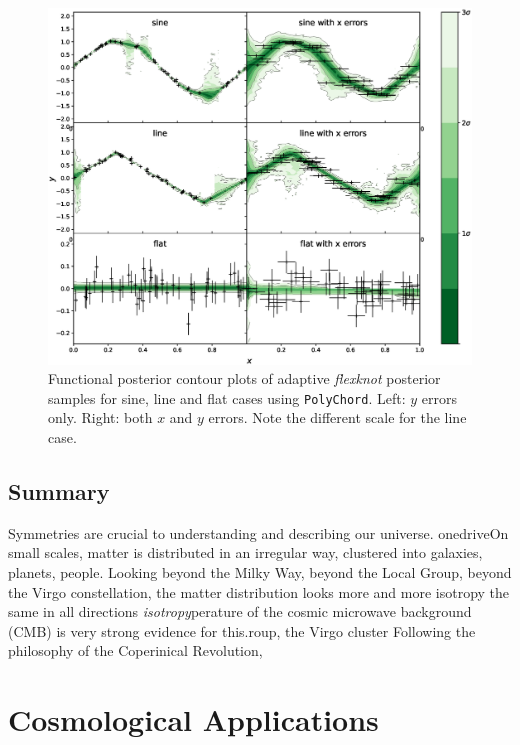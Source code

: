 \documentclass{article}
\begin{document}
\newpage

\newpage


\newpage

\begin{figure}[H]
  \centering
  \includegraphics[width=16cm]{toysineadaptive.eps}
  \caption{Functional posterior contour plots of adaptive \textit{flexknot} posterior samples for sine, line and flat cases using \texttt{PolyChord}. Left: $y$ errors only. Right: both $x$ and $y$ errors. Note the different scale for the line case.}
  \label{fig:toysineadaptive}
\end{figure}
\subsection{Summary}
Symmetries are crucial to understanding and describing our universe. onedriveOn small scales, matter is distributed in an irregular way, clustered into galaxies, planets, people. Looking beyond the Milky Way, beyond the Local Group, beyond the Virgo constellation, the matter distribution looks more and more isotropy the same in all directions \textit{isotropy}perature of the cosmic microwave background (CMB) is very strong evidence for this.roup, the Virgo cluster Following the philosophy of the Coperinical Revolution, 

\newpage

\section{Cosmological Applications}
\end{document}
